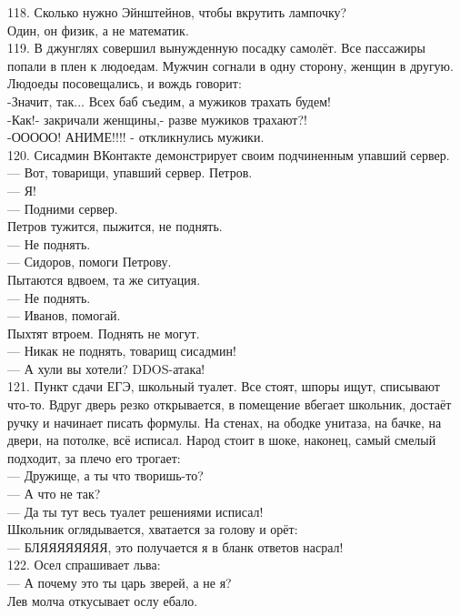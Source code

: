 \documentclass[a4paper,20pt,notitlepage]{extbook}
\begin{document}
	118. Сколько нужно Эйнштейнов, чтобы вкрутить лампочку?\\
	Один, он физик, а не математик.\\
	
	119. В джунглях совершил вынужденную посадку самолёт. Все пассажиры попали в плен к людоедам. Мужчин согнали в одну сторону, женщин в другую. Людоеды посовещались, и вождь говорит:\\
	-Значит, так... Всех баб съедим, а мужиков трахать будем!\\
	-Как!- закричали женщины,- разве мужиков трахают?!\\
	-ООООО! АНИМЕ!!!! - откликнулись мужики.\\
	
	120. Сисадмин ВКонтакте демонстрирует своим подчиненным упавший сервер.\\
	— Вот, товарищи, упавший сервер. Петров.\\
	— Я!\\
	— Подними сервер.\\
	Петров тужится, пыжится, не поднять.\\
	— Не поднять.\\
	— Сидоров, помоги Петрову.\\
	Пытаются вдвоем, та же ситуация.\\
	— Не поднять.\\
	— Иванов, помогай.\\
	Пыхтят втроем. Поднять не могут.\\
	— Никак не поднять, товарищ сисадмин!\\
	— А хули вы хотели? DDOS-атака!\\
	
	121. Пункт сдачи ЕГЭ, школьный туалет. Все стоят, шпоры ищут, списывают что-то. Вдруг дверь резко открывается, в помещение вбегает школьник, достаёт ручку и начинает писать формулы. На стенах, на ободке унитаза, на бачке, на двери, на потолке, всё исписал. Народ стоит в шоке, наконец, самый смелый подходит, за плечо его трогает:\\
	— Дружище, а ты что творишь-то?\\
	— А что не так?\\
	— Да ты тут весь туалет решениями исписал!\\
	Школьник оглядывается, хватается за голову и орёт:\\
	— БЛЯЯЯЯЯЯЯЯ, это получается я в бланк ответов насрал!\\
	
	122. Осел спрашивает льва: \\
	— А почему это ты царь зверей, а не я? \\
	Лев молча откусывает ослу ебало.\\
	
\end{document}
